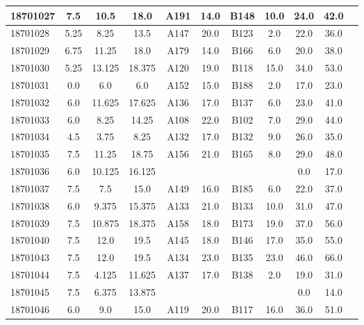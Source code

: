 \documentclass[12pt]{article}
\begin{document}
\begin{center}
\begin{small}
\begin{tabular}{|l|c|c|c|c|c|c|c|c|c|c|}
18701027 & 7.5 & 10.5 & 18.0 & A191 & 14.0 & B148 & 10.0 & 24.0 & 42.0\\ \hline 
18701028 & 5.25 & 8.25 & 13.5 & A147 & 20.0 & B123 & 2.0 & 22.0 & 36.0\\ \hline 
18701029 & 6.75 & 11.25 & 18.0 & A179 & 14.0 & B166 & 6.0 & 20.0 & 38.0\\ \hline 
18701030 & 5.25 & 13.125 & 18.375 & A120 & 19.0 & B118 & 15.0 & 34.0 & 53.0\\ \hline 
18701031 & 0.0 & 6.0 & 6.0 & A152 & 15.0 & B188 & 2.0 & 17.0 & 23.0\\ \hline 
18701032 & 6.0 & 11.625 & 17.625 & A136 & 17.0 & B137 & 6.0 & 23.0 & 41.0\\ \hline 
18701033 & 6.0 & 8.25 & 14.25 & A108 & 22.0 & B102 & 7.0 & 29.0 & 44.0\\ \hline 
18701034 & 4.5 & 3.75 & 8.25 & A132 & 17.0 & B132 & 9.0 & 26.0 & 35.0\\ \hline 
18701035 & 7.5 & 11.25 & 18.75 & A156 & 21.0 & B165 & 8.0 & 29.0 & 48.0\\ \hline 
18701036 & 6.0 & 10.125 & 16.125 &  &  &  &  & 0.0 & 17.0\\ \hline 
18701037 & 7.5 & 7.5 & 15.0 & A149 & 16.0 & B185 & 6.0 & 22.0 & 37.0\\ \hline 
18701038 & 6.0 & 9.375 & 15.375 & A133 & 21.0 & B133 & 10.0 & 31.0 & 47.0\\ \hline 
18701039 & 7.5 & 10.875 & 18.375 & A158 & 18.0 & B173 & 19.0 & 37.0 & 56.0\\ \hline 
18701040 & 7.5 & 12.0 & 19.5 & A145 & 18.0 & B146 & 17.0 & 35.0 & 55.0\\ \hline 
18701043 & 7.5 & 12.0 & 19.5 & A134 & 23.0 & B135 & 23.0 & 46.0 & 66.0\\ \hline 
18701044 & 7.5 & 4.125 & 11.625 & A137 & 17.0 & B138 & 2.0 & 19.0 & 31.0\\ \hline 
18701045 & 7.5 & 6.375 & 13.875 &  &  &  &  & 0.0 & 14.0\\ \hline 
18701046 & 6.0 & 9.0 & 15.0 & A119 & 20.0 & B117 & 16.0 & 36.0 & 51.0\\ \hline 
        \end{tabular}
            \end{small}
            \end{center}
  \centering
            
\end{document}
